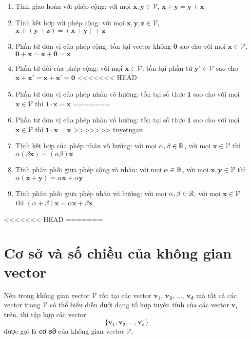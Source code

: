 \begin{enumerate}[noitemsep]
    \item Tính giao hoán với phép cộng: với mọi $\bm{x}, \bm{y} \in \mathcal{V}$, $\bm{x} + \bm{y} = \bm{y} + \bm{x}$
    \item Tính kết hợp với phép cộng: với mọi $\bm{x}, \bm{y}, \bm{z} \in \mathcal{V}$, $\bm{x} + (\bm{y} + \bm{z}) = (\bm{x} + \bm{y}) + \bm{z}$
    \item Phần tử đơn vị của phép cộng: tồn tại vector không $\bm{0}$ sao cho với mọi $\bm{x} \in \mathcal{V}$, $\bm{0} + \bm{x} = \bm{x} + \bm{0} = \bm{x}$
    \item Phần tử đối của phép cộng: với mọi $\bm{x} \in \mathcal{V}$, tồn tại phần tử $\bm{y'} \in \mathcal{V}$ sao cho $\bm{x} + \bm{x'} = \bm{x} + \bm{x'} = \bm{0}$
<<<<<<< HEAD
    \item Phần tử đơn vị của phép nhân vô hướng: tồn tại số thực $\bm{1}$ sao cho với mọi $\bm{x} \in \mathcal{V}$ thì $1 \cdot \bm{x} = \bm{x}$
=======
    \item Phần tử đơn vị của phép nhân vô hướng: tồn tại số thực $\bm{1}$ sao cho với mọi $\bm{x} \in \mathcal{V}$ thì $\bm{1} \cdot \bm{x} = \bm{x}$
>>>>>>> tuyetngan
    \item Tính kết hợp của phép nhân vô hướng: với mọi $\alpha, \beta \in \mathbb{R}$, với mọi $\bm{x} \in \mathcal{V}$ thì $\alpha (\beta \bm{x}) = (\alpha \beta) \bm{x}$
    \item Tính phân phối giữa phép cộng và nhân: với mọi $\alpha \in \mathbb{R}$, với mọi $\bm{x}, \bm{y} \in \mathcal{V}$ thì $\alpha (\bm{x} + \bm{y}) = \alpha \bm{x} + \alpha \bm{y}$
    \item Tính phân phối giữa phép nhân vô hướng: với mọi $\alpha, \beta \in \mathbb{R}$, với mọi $\bm{x} \in \mathcal{V}$ thì $(\alpha + \beta) \bm{x} = \alpha \bm{x} + \beta \bm{x}$
\end{enumerate}

<<<<<<< HEAD
=======
\section{Cơ sở và số chiều của không gian vector}

Nếu trong không gian vector $\mathcal{V}$ tồn tại các vector $\bm{v_1}$, $\bm{v_2}$, ..., $\bm{v_d}$
mà tất cả các vector trong $\mathcal{V}$ có thể biểu diễn dưới dạng tổ hợp tuyến tính của các vector $\bm{v_i}$ trên,
thì tập hợp các vector 
\[\{ \bm{v_1}, \bm{v_2}, \ldots, \bm{v_d} \}\]
được gọi là \textbf{cơ sở} của không gian vector $\mathcal{V}$.

